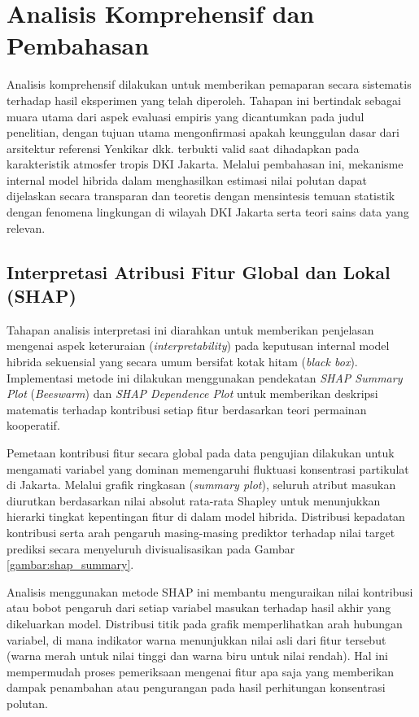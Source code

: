 \section{Analisis Komprehensif dan Pembahasan}

Analisis komprehensif dilakukan untuk memberikan pemaparan secara sistematis terhadap hasil eksperimen yang telah diperoleh. Tahapan ini bertindak sebagai muara utama dari aspek evaluasi empiris yang dicantumkan pada judul penelitian, dengan tujuan utama mengonfirmasi apakah keunggulan dasar dari arsitektur referensi Yenkikar dkk. \autocite{yenkikar2025explainable} terbukti valid saat dihadapkan pada karakteristik atmosfer tropis DKI Jakarta. Melalui pembahasan ini, mekanisme internal model hibrida dalam menghasilkan estimasi nilai polutan dapat dijelaskan secara transparan dan teoretis dengan mensintesis temuan statistik dengan fenomena lingkungan di wilayah DKI Jakarta serta teori sains data yang relevan.

\subsection{Interpretasi Atribusi Fitur Global dan Lokal (SHAP)}

Tahapan analisis interpretasi ini diarahkan untuk memberikan penjelasan mengenai aspek keteruraian (\textit{interpretability}) pada keputusan internal model hibrida sekuensial yang secara umum bersifat kotak hitam (\textit{black box}). Implementasi metode ini dilakukan menggunakan pendekatan \textit{SHAP Summary Plot} (\textit{Beeswarm}) dan \textit{SHAP Dependence Plot} untuk memberikan deskripsi matematis terhadap kontribusi setiap fitur berdasarkan teori permainan kooperatif. 

Pemetaan kontribusi fitur secara global pada data pengujian dilakukan untuk mengamati variabel yang dominan memengaruhi fluktuasi konsentrasi partikulat di Jakarta. Melalui grafik ringkasan (\textit{summary plot}), seluruh atribut masukan diurutkan berdasarkan nilai absolut rata-rata Shapley untuk menunjukkan hierarki tingkat kepentingan fitur di dalam model hibrida. Distribusi kepadatan kontribusi serta arah pengaruh masing-masing prediktor terhadap nilai target prediksi secara menyeluruh divisualisasikan pada Gambar \ref{gambar:shap_summary}.

Analisis menggunakan metode SHAP ini membantu menguraikan nilai kontribusi atau bobot pengaruh dari setiap variabel masukan terhadap hasil akhir yang dikeluarkan model. Distribusi titik pada grafik memperlihatkan arah hubungan variabel, di mana indikator warna menunjukkan nilai asli dari fitur tersebut (warna merah untuk nilai tinggi dan warna biru untuk nilai rendah). Hal ini mempermudah proses pemeriksaan mengenai fitur apa saja yang memberikan dampak penambahan atau pengurangan pada hasil perhitungan konsentrasi polutan.

